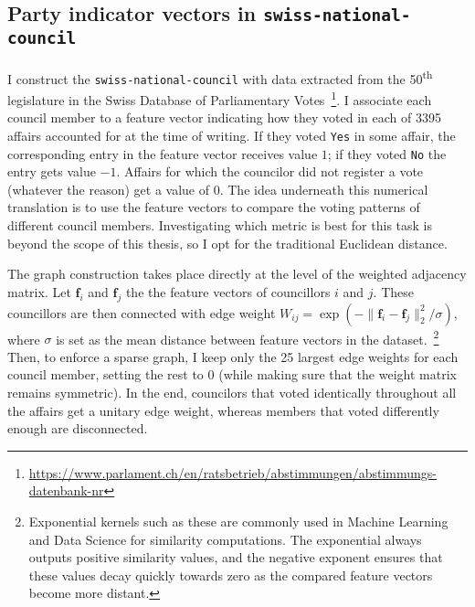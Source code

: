 \subsection{Party indicator vectors in \texttt{swiss-national-council}}

I construct the \texttt{swiss-national-council} with data extracted from the 50\textsuperscript{th} legislature in the Swiss Database of Parliamentary Votes~\footnote{\url{https://www.parlament.ch/en/ratsbetrieb/abstimmungen/abstimmungs-datenbank-nr}}. I associate each council member to a feature vector indicating how they voted in each of 3395 affairs accounted for at the time of writing. If they voted \texttt{Yes} in some affair, the corresponding entry in the feature vector receives value $1$; if they voted \texttt{No} the entry gets value $-1$. Affairs for which the councilor did not register a vote (whatever the reason) get a value of $0$. The idea underneath this numerical translation is to use the feature vectors to compare the voting patterns of different council members. Investigating which metric is best for this task is beyond the scope of this thesis, so I opt for the traditional Euclidean distance.

The graph construction takes place directly at the level of the weighted adjacency matrix. Let $\mathbf{f}_i$ and $\mathbf{f}_j$ the the feature vectors of councillors $i$ and $j$. These councillors are then connected with edge weight $W_{ij} = \exp \left ( -\| \mathbf{f}_i - \mathbf{f}_j \|_2^2 / \sigma \right )$, where $\sigma$ is set as the mean distance between feature vectors in the dataset.~\footnote{Exponential kernels such as these are commonly used in Machine Learning and Data Science for similarity computations. The exponential always outputs positive similarity values, and the negative exponent ensures that these values decay quickly towards zero as the compared feature vectors become more distant.} Then, to enforce a sparse graph, I keep only the 25 largest edge weights for each council member, setting the rest to $0$ (while making sure that the weight matrix remains symmetric). In the end, councilors that voted identically throughout all the affairs get a unitary edge weight, whereas members that voted differently enough are disconnected.

